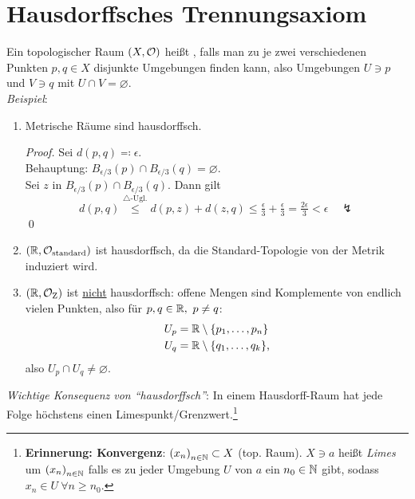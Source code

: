 \section{Hausdorffsches Trennungsaxiom}
\begin{remark}\label{def:hausdorffsch}
  Ein topologischer Raum \( (X,\mathcal{O}) \) heißt , falls man zu je zwei verschiedenen Punkten \( p,q \in X \) disjunkte Umgebungen finden kann, also Umgebungen \( U \ni p \) und \( V \ni q \) mit \( U \cap V = \varnothing \). \\
  \emph{Beispiel}:
  \begin{enumerate}
    \item Metrische Räume sind hausdorffsch.
    \begin{proof}
       Sei \( d(p,q) \eqqcolon \epsilon \). \\
       Behauptung: \( B_{\epsilon/3}(p) \cap B_{\epsilon/3}(q) = \varnothing \). \\
       Sei \( z \) in \( B_{\epsilon/3}(p) \cap B_{\epsilon/3}(q) \). Dann gilt
       \begin{equation*}
         d(p,q) \overset{\triangle\text{-Ugl.}}{\leq} d(p,z)+d(z,q) \leq \tfrac{\epsilon}{3} + \tfrac{\epsilon}{3} = \tfrac{2\epsilon}{3} < \epsilon \quad \lightning
       \end{equation*}
       \qed{}
     \end{proof} 
    \item \( (\mathbb{R}, \mathcal{O}_\text{standard}) \) ist hausdorffsch, da die Standard-Topologie von der Metrik induziert wird.
    \item \( (\mathbb{R}, \mathcal{O}_\text{Z}) \) ist \underline{nicht} hausdorffsch: offene Mengen sind Komplemente von endlich vielen Punkten, also für \( p, q \in \mathbb{R}, \ p \neq q \):
    \begin{align*}
      U_p &= \mathbb{R} \setminus \{ p_1, \dots, p_n \} \\
      U_q &= \mathbb{R} \setminus \{ q_1, \dots, q_k \}\text{,}
    \end{align*}
    also \( U_p \cap U_q \neq \varnothing \).
  \end{enumerate}
  \emph{Wichtige Konsequenz von ``hausdorffsch''}: In einem Hausdorff-Raum hat jede Folge höchstens einen Limespunkt/Grenzwert.\footnote{\textbf{Erinnerung: Konvergenz}\label{def:konvergenz}: \( {(x_n)}_{n \in \mathbb{N}} \subset X \) (top. Raum). \( X \ni a \) heißt \emph{Limes} um \( {(x_n)}_{n \in \mathbb{N}} \) falls es zu jeder Umgebung \( U \) von \( a \) ein \( n_0 \in \mathbb{N} \) gibt, sodass \( x_n \in U \ \forall n \geq n_0 \).}
\end{remark}

